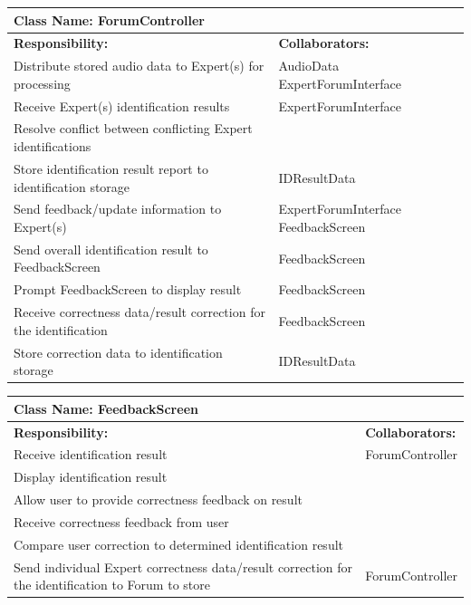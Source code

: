 \documentclass[]{article}
\begin{document}
\newpage
	\begin{table}[ht]
		\centering
		\begin{tabular}{|p{5cm}|p{5cm}|}
		\hline 
		 \multicolumn{2}{|l|}{\textbf{Class Name: ForumController}} \\
		\hline
		\textbf{Responsibility:} & \textbf{Collaborators:} \\
		\hline
		Distribute stored audio data to Expert(s) for processing & AudioData \mbox{ExpertForumInterface} \\
		\hline
		Receive Expert(s) identification results & ExpertForumInterface \\
		\hline
		Resolve conflict between conflicting Expert identifications & \\
		\hline
		Store identification result report to identification storage & IDResultData \\
		\hline
		Send feedback/update information to Expert(s) & ExpertForumInterface \mbox{FeedbackScreen} \\
		\hline
		Send overall identification result to FeedbackScreen & FeedbackScreen \\
		\hline
		Prompt FeedbackScreen to display result & FeedbackScreen \\
		\hline
		Receive correctness data/result correction for the identification & FeedbackScreen \\
		\hline
		Store correction data to identification storage & IDResultData \\
		\hline
		\end{tabular}
	\end{table}
	
	\begin{table}[ht]
		\centering
		\begin{tabular}{|p{5cm}|p{5cm}|}
		\hline 
		 \multicolumn{2}{|l|}{\textbf{Class Name: FeedbackScreen}} \\
		\hline
		\textbf{Responsibility:} & \textbf{Collaborators:} \\
		\hline
		Receive identification result & ForumController \\
		\hline
		Display identification result &  \\
		\hline
		Allow user to provide correctness feedback on result &  \\
		\hline
		Receive correctness feedback from user &  \\
		\hline
		Compare user correction to determined identification result &  \\
		\hline
		Send individual Expert correctness data/result correction for the identification to Forum to store & ForumController \\
		\hline
		\end{tabular}
	\end{table}
	
\end{document}
